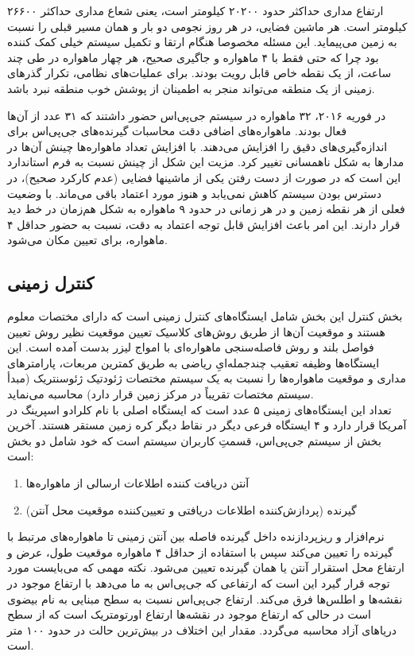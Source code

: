 ارتفاع مداری حداکثر حدود ۲۰۲۰۰ کیلومتر است، یعنی شعاع مداری حداکثر ۲۶۶۰۰ کیلومتر است. هر ماشین فضایی، در هر روز نجومی دو بار و همان مسیر قبلی را نسبت به زمین می‌پیماید. این مسئله مخصوصا هنگام ارتقا و تکمیل سیستم خیلی کمک‌ کننده بود چرا که حتی فقط با ۴ ماهواره و جاگیری صحیح، هر چهار ماهواره در طی چند ساعت، از یک نقطه خاص قابل رویت بودند. برای عملیات‌های نظامی، تکرار گذرهای زمینی از یک منطقه می‌تواند منجر به اطمینان از پوشش خوب منطقه نبرد باشد.


در فوریه ۲۰۱۶، ۳۲ ماهواره در سیستم جی‌پی‌اس حضور داشتند که ۳۱ عدد از آن‌ها فعال بودند. ماهواره‌های اضافی دقت محاسبات گیرنده‌های جی‌پی‌اس برای اندازه‌گیری‌های دقیق را افزایش می‌دهند. با افزایش تعداد ماهواره‌ها چینش آن‌ها در مدارها به شکل ناهمسانی تغییر کرد. مزیت این شکل از چینش نسبت به فرم استاندارد این است که در صورت از دست رفتن یکی از ماشینها فضایی (عدم کارکرد صحیح)، در دسترس بودن سیستم کاهش نمی‌یابد و هنوز مورد اعتماد باقی می‌ماند. با وضعیت فعلی از هر نقطه زمین و در هر زمانی در حدود ۹ ماهواره به شکل هم‌زمان در خط دید قرار دارند. این امر باعث افزایش قابل توجه اعتماد به دقت، نسبت به حضور حداقل ۴ ماهواره، برای تعیین مکان می‌شود.
\subsection{کنترل زمینی}
بخش کنترل این بخش شامل ایستگاه‌های کنترل زمینی است که دارای مختصات معلوم هستند و موقعیت آن‌ها از طریق روش‌های کلاسیک تعیین موقعیت نظیر روش تعیین فواصل بلند و روش فاصله‌سنجی ماهواره‌ای با امواج لیزر بدست آمده ‌است. این ایستگاه‌ها وظیفه تعقیب چندجمله‌ایِ ریاضی به طریق کمترین مربعات، پارامترهای مداری و موقعیت ماهواره‌ها را نسبت به یک سیستم مختصات ژئودتیک ژئوسنتریک (مبدأ سیستم مختصات تقریباً در مرکز زمین قرار دارد) محاسبه می‌نماید.
\\
تعداد این ایستگاه‌های زمینی ۵ عدد است که ایستگاه اصلی با نام کلرادو اسپرینگ در آمریکا قرار دارد و ۴ ایستگاه فرعی دیگر در نقاط دیگر کره زمین مستقر هستند. آخرین بخش از سیستم جی‌پی‌اس، قسمتِ کاربران سیستم است که خود شامل دو بخش است:
\begin{enumerate}
	\item آنتن دریافت ‌کننده اطلاعات ارسالی از ماهواره‌ها
	\item گیرنده (پردازش‌کننده اطلاعات دریافتی و تعیین‌کننده موقعیت محل آنتن)
\end{enumerate}
نرم‌افزار و ریزپردازنده داخل گیرنده فاصله بین آنتن زمینی تا ماهواره‌های مرتبط با گیرنده را تعیین می‌کند سپس با استفاده از حداقل ۴ ماهواره موقعیت طول، عرض و ارتفاع محل استقرار آنتن یا همان گیرنده تعیین می‌شود.
نکته مهمی که می‌بایست مورد توجه قرار گیرد این است که ارتفاعی که جی‌پی‌اس به ما می‌دهد با ارتفاع موجود در نقشه‌ها و اطلس‌ها فرق می‌کند. ارتفاع جی‌پی‌اس نسبت به سطح مبنایی به نام بیضوی است در حالی که ارتفاع موجود در نقشه‌ها ارتفاع اورتومتریک است که از سطح دریاهای آزاد محاسبه می‌گردد. مقدار این اختلاف در بیش‌ترین حالت در حدود ۱۰۰ متر است.
